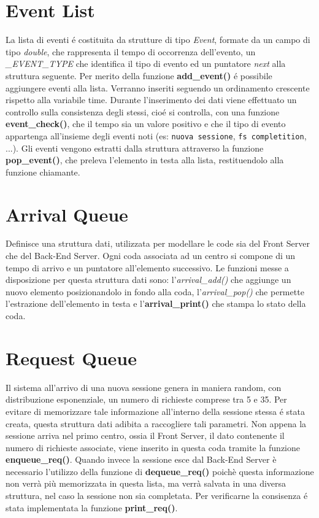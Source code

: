\section{Event List}
La lista di eventi \'e costituita da strutture di tipo \textit{Event}, formate 
da un campo di tipo \textit{double}, che rappresenta il tempo 
di occorrenza dell'evento, un \textit{\_EVENT\_TYPE} che identifica il tipo di 
evento 
ed un puntatore \textit{next} alla struttura seguente.
Per merito della funzione \textbf{add\_event()} \'e possibile aggiungere eventi 
alla lista. Verranno inseriti seguendo un ordinamento crescente rispetto alla 
variabile time. Durante l'inserimento dei dati viene effettuato un controllo 
sulla consistenza degli stessi, cio\'e si controlla, con una funzione 
\textbf{event\_check()}, che il tempo sia un valore positivo e che il tipo di 
evento appartenga all'insieme degli eventi noti (es: \texttt{nuova sessione}, 
\texttt{fs completition}, ...).     
Gli eventi vengono estratti dalla struttura attraverso la funzione 
\textbf{pop\_event()}, che preleva l'elemento in testa alla lista, 
restituendolo 
alla funzione chiamante.

\section{Arrival Queue}
Definisce una struttura dati, utilizzata per modellare le code sia del Front Server
che del Back-End Server. Ogni coda associata ad un centro si compone di un tempo di arrivo e un puntatore all'elemento successivo. 
Le funzioni messe a disposizione per questa struttura dati sono: 
l'\textit{arrival\_add()} che aggiunge un nuovo elemento posizionandolo in fondo alla coda, l'\textit{arrival\_pop()} 
che permette l'estrazione dell'elemento in testa e l'\textbf{arrival\_print()} che stampa lo stato della coda.

\section{Request Queue}
Il sistema all'arrivo di una nuova sessione genera in maniera random,
con distribuzione esponenziale, un numero di richieste comprese tra 5 e 35.
Per evitare di memorizzare tale informazione all'interno della sessione stessa
\'e stata creata, questa struttura dati adibita a raccogliere tali parametri.
Non appena la sessione arriva nel primo centro, ossia il Front Server, il dato 
contenente il numero di richieste associate, viene inserito in questa coda tramite la funzione 
\textbf{enqueue\_req()}. Quando invece la sessione esce dal Back-End Server è necessario
l'utilizzo della funzione di \textbf{dequeue\_req()} poichè questa informazione non verrà pi\`u
memorizzata in questa lista, ma verrà salvata in una diversa struttura, nel caso la sessione non sia completata.
Per verificarne la consisenza \'e stata implementata la funzione \textbf{print\_req()}.

